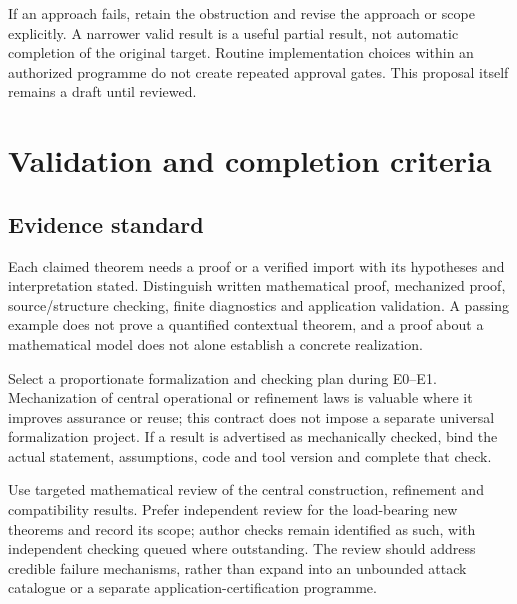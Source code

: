 \documentclass[11pt,a4paper]{article}
\begin{document}
If an approach fails, retain the obstruction and revise the approach or scope explicitly. A narrower valid result is a useful partial result, not automatic completion of the original target. Routine implementation choices within an authorized programme do not create repeated approval gates. This proposal itself remains a draft until reviewed.

\section{Validation and completion criteria}\label{sec:completion}

\subsection{Evidence standard}
Each claimed theorem needs a proof or a verified import with its hypotheses and interpretation stated. Distinguish written mathematical proof, mechanized proof, source/structure checking, finite diagnostics and application validation. A passing example does not prove a quantified contextual theorem, and a proof about a mathematical model does not alone establish a concrete realization.

Select a proportionate formalization and checking plan during E0--E1. Mechanization of central operational or refinement laws is valuable where it improves assurance or reuse; this contract does not impose a separate universal formalization project. If a result is advertised as mechanically checked, bind the actual statement, assumptions, code and tool version and complete that check.

Use targeted mathematical review of the central construction, refinement and compatibility results. Prefer independent review for the load-bearing new theorems and record its scope; author checks remain identified as such, with independent checking queued where outstanding. The review should address credible failure mechanisms, rather than expand into an unbounded attack catalogue or a separate application-certification programme.
\end{document}
